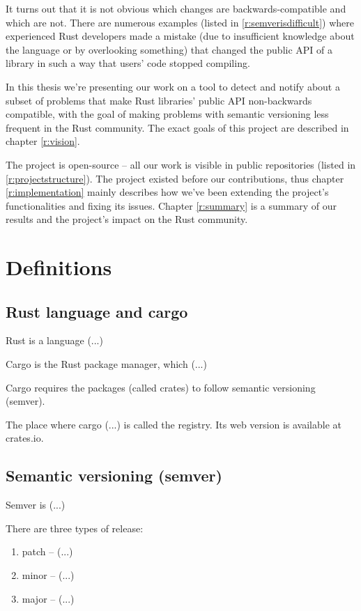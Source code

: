 \documentclass[licencjacka,en]{pracamgr}
\begin{document}
It turns out that it is not obvious which changes are backwards-compatible
and which are not. There are numerous examples (listed in \ref{r:semverisdifficult})
where experienced Rust developers made a mistake 
(due to insufficient knowledge about the language or by overlooking something)
that changed the public API of a library in such a way that users' code stopped compiling.

In this thesis we're presenting our work on a tool to detect and notify about
a subset of problems that make Rust libraries' public API non-backwards compatible,
with the goal of making problems with semantic versioning less frequent in the Rust community.
The exact goals of this project are described in chapter \ref{r:vision}.

The project is open-source -- all our work is visible in public repositories
(listed in \ref{r:projectstructure}). The project existed before our contributions,
thus chapter \ref{r:implementation} mainly describes how we've 
been extending the project's functionalities and fixing its issues.
Chapter \ref{r:summary} is a summary of our results and the project's impact 
on the Rust community.



\chapter{Definitions}\label{r:definitions}

\section{Rust language and cargo}

Rust is a language (...)

Cargo is the Rust package manager, which (...)

Cargo requires the packages (called crates) to follow semantic versioning (semver).

The place where cargo (...) is called the registry.
Its web version is available at crates.io.


\section{Semantic versioning (semver)}

Semver is (...)

There are three types of release:
\begin{enumerate}
	\item patch -- (...)
	\item minor -- (...)
	\item major -- (...)
\end{enumerate}
\end{document}
